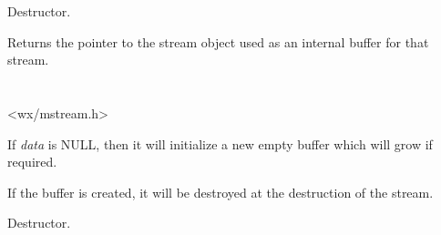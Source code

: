
Destructor.

\label{wxmemoryinputstreamgetistrmbuf}


Returns the pointer to the stream object used as an internal buffer
for that stream.

\section{}\label{wxmemoutputstream}




<wx/mstream.h>






\label{wxmemoryoutputstreamctor}


If {\it data} is NULL, then it will initialize a new empty buffer which will
grow if required.


If the buffer is created, it will be destroyed at the destruction of the
stream.

\label{wxmemoryoutputstreamdtor}


Destructor.

\label{wxmemoryoutputstreamcopyto}

